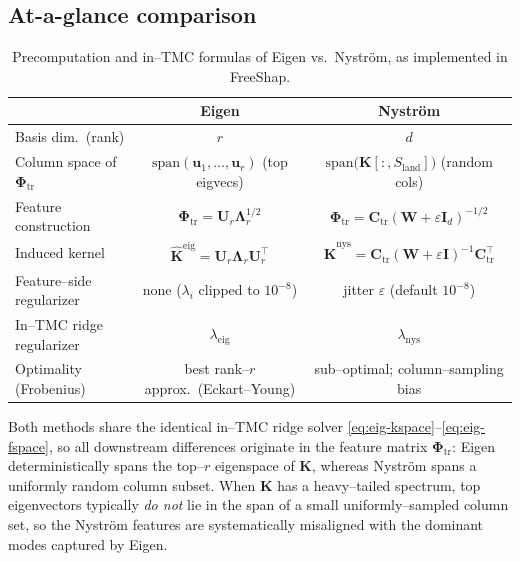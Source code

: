\subsection{At-a-glance comparison}

\begin{table}[h]
\centering
\small
\begin{tabular}{lcc}
\toprule
& \textbf{Eigen} & \textbf{Nystr\"om} \\
\midrule
Basis dim.\ (rank) & $r$ & $d$ \\[1pt]
Column space of $\boldsymbol{\Phi}_{\mathrm{tr}}$ &
$\mathrm{span}(\mathbf{u}_1,\dots,\mathbf{u}_r)$ (top eigvecs) &
$\mathrm{span}\!\bigl(\mathbf{K}[:,S_{\mathrm{land}}]\bigr)$ (random cols) \\[1pt]
Feature construction &
$\boldsymbol{\Phi}_{\mathrm{tr}}=\mathbf{U}_r\boldsymbol{\Lambda}_r^{1/2}$ &
$\boldsymbol{\Phi}_{\mathrm{tr}}=\mathbf{C}_{\mathrm{tr}}(\mathbf{W}+\varepsilon\mathbf{I}_d)^{-1/2}$ \\[1pt]
Induced kernel &
$\widehat{\mathbf{K}}^{\mathrm{eig}}=\mathbf{U}_r\boldsymbol{\Lambda}_r\mathbf{U}_r^{\!\top}$ &
$\widehat{\mathbf{K}}^{\mathrm{nys}}=\mathbf{C}_{\mathrm{tr}}(\mathbf{W}\!+\!\varepsilon\mathbf{I})^{-1}\mathbf{C}_{\mathrm{tr}}^{\!\top}$ \\[1pt]
Feature--side regularizer &
none ($\lambda_i$ clipped to $10^{-8}$) &
jitter $\varepsilon$ (default $10^{-8}$) \\[1pt]
In--TMC ridge regularizer & $\lambda_{\mathrm{eig}}$ & $\lambda_{\mathrm{nys}}$ \\[1pt]
Optimality (Frobenius) &
best rank--$r$ approx.\ (Eckart--Young) &
sub--optimal; column--sampling bias \\
\bottomrule
\end{tabular}
\caption{Precomputation and in--TMC formulas of Eigen vs.\ Nystr\"om, as implemented in FreeShap.}
\label{tab:eig-nys}
\end{table}

Both methods share the identical in--TMC ridge solver \eqref{eq:eig-kspace}--\eqref{eq:eig-fspace}, so all downstream differences originate in the feature matrix $\boldsymbol{\Phi}_{\mathrm{tr}}$: Eigen deterministically spans the top--$r$ eigenspace of $\mathbf{K}$, whereas Nystr\"om spans a uniformly random column subset. When $\mathbf{K}$ has a heavy--tailed spectrum, top eigenvectors typically \emph{do not} lie in the span of a small uniformly--sampled column set, so the Nystr\"om features are systematically misaligned with the dominant modes captured by Eigen.
